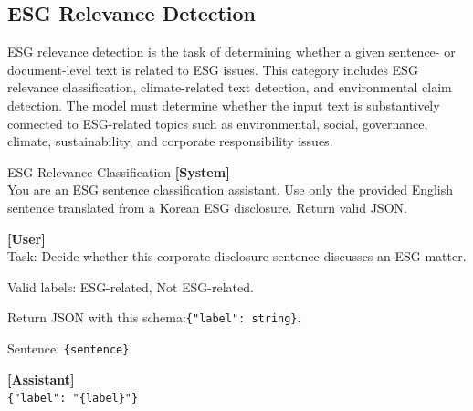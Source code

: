 \documentclass[11pt]{article}
\begin{document}
\subsection{ESG Relevance Detection}
ESG relevance detection is the task of determining whether a given sentence- or document-level text is related to ESG issues. This category includes ESG relevance classification, climate-related text detection, and environmental claim detection. The model must determine whether the input text is substantively connected to ESG-related topics such as environmental, social, governance, climate, sustainability, and corporate responsibility issues.

\begin{promptbox}{ESG Relevance Classification}
\small
\textbf{[System]}\\
You are an ESG sentence classification assistant. Use only the provided English sentence translated from a Korean ESG disclosure. Return valid JSON.

\vspace{0.6em}
\textbf{[User]}\\
Task: Decide whether this corporate disclosure sentence discusses an ESG matter.

\vspace{0.3em}
Valid labels: ESG-related, Not ESG-related.

\vspace{0.3em}
Return JSON with this schema:\newline \texttt{\{"label": string\}}.

\vspace{0.3em}
Sentence: \texttt{\{sentence\}}

\vspace{0.6em}
\textbf{[Assistant]}\\
\texttt{\{"label": "\{label\}"\}}
\end{promptbox}
\end{document}
